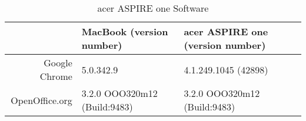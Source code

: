   \begin{table}
    \begin{center}
    \begin{tabular}{| r | p{5cm} | p{5cm} |}
      \hline
                                   & MacBook (version number)     & acer ASPIRE one (version number)  \\ \hline
      Google Chrome                & 5.0.342.9                    & 4.1.249.1045 (42898)               \\ \hline
      OpenOffice.org               & 3.2.0 OOO320m12 (Build:9483) & 3.2.0 OOO320m12 (Build:9483)       \\
      \hline
    \end{tabular}
    \caption{acer ASPIRE one Software}
    \label{table:softwareSpecs}
    \end{center}
  \end{table}
